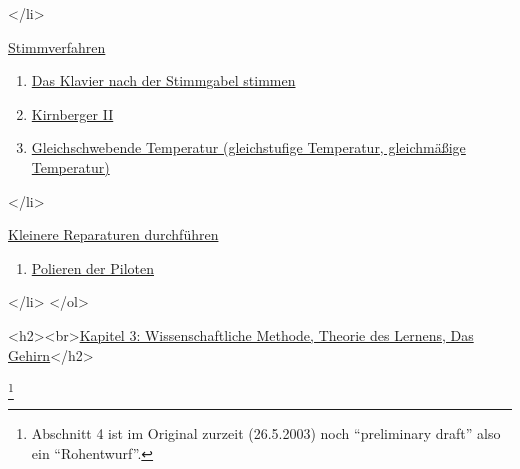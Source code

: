 {\begin{enumerate}
   \end{enumerate}
 </li>
 \item \hyperref[c2_6]{Stimmverfahren}
  \begin{enumerate}[label={\alph*.}] 
   <li>\hyperref[c2_6a]{Einleitung}
   \item \hyperref[c2_6_gabe]{Das Klavier nach der Stimmgabel stimmen}
   \item \hyperref[c2_6_kirn]{Kirnberger II}
   \item \hyperref[c2_6_et]{Gleichschwebende Temperatur (gleichstufige Temperatur, gleichmäßige Temperatur)}
   \end{enumerate}
 </li>
 \item \hyperref[c2_7]{Kleinere Reparaturen durchführen}
  \begin{enumerate}[label={\alph*.}] 
   <li>\hyperref[c2_7_hamm]{Intonieren der Hämmer}
   \item \hyperref[c2_7_pilo]{Polieren der Piloten}
   \end{enumerate}
 </li>
</ol> 

<h2><br>\hyperref[c3_1]{Kapitel 3: Wissenschaftliche Methode, Theorie des Lernens, Das Gehirn}</h2>

\footnote{Abschnitt 4 ist im Original zurzeit (26.5.2003) noch \enquote{preliminary draft} also ein \enquote{Rohentwurf}.}


}
